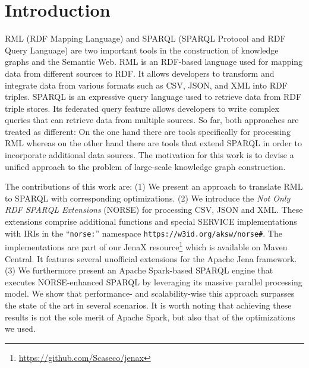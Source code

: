 

\section{Introduction}
RML (RDF Mapping Language) and SPARQL (SPARQL Protocol and RDF Query Language) are two important tools in the construction of knowledge graphs and the Semantic Web.
RML is an RDF-based language used for mapping data from different sources to RDF. It allows developers to transform and integrate data from various formats such as CSV, JSON, and XML into RDF triples.
SPARQL is an expressive query language used to retrieve data from RDF triple stores. Its federated query feature allows developers to write complex queries that can retrieve data from multiple sources.
So far, both approaches are treated as different: On the one hand there are tools specifically for
processing RML whereas on the other hand there are tools that extend SPARQL in order to incorporate additional data sources.
The motivation for this work is to devise a unified approach to the problem of large-scale knowledge graph construction.

The contributions of this work are: (1) We present an approach to translate RML to SPARQL with corresponding optimizations.
(2) We introduce the \emph{Not Only RDF SPARQL Extensions} (NORSE) for processing CSV, JSON and XML.
These extensions comprise additional functions and special SERVICE implementations with IRIs in the ``\texttt{norse:}'' namespace \texttt{https://w3id.org/aksw/norse\#}.
 The implementations are part of our JenaX resource\footnote{\url{https://github.com/Scaseco/jenax}} which is available on Maven Central. It features several unofficial extensions for the Apache Jena framework.
(3) We furthermore present an Apache Spark-based SPARQL engine that executes NORSE-enhanced SPARQL by leveraging its massive parallel processing model. We show that performance- and scalability-wise this approach surpasses the state of the art in several scenarios.
It is worth noting that achieving these results is not the sole merit of Apache Spark, but also that of the optimizations we used.

